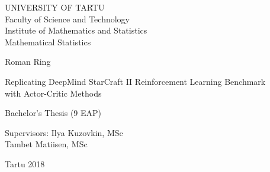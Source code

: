 \thispagestyle{empty}

\begin{center}

\large
UNIVERSITY OF TARTU\\
Faculty of Science and Technology\\
Institute of Mathematics and Statistics\\
Mathematical Statistics\\

\vspace{25mm}

\Large Roman Ring

\vspace{4mm}

\huge Replicating DeepMind StarCraft II 
Reinforcement Learning Benchmark \\
with Actor-Critic Methods

\vspace{4mm}

\Large Bachelor's Thesis (9 EAP)

\end{center}

\vspace{25mm}

\begin{flushright}
\Large Supervisors: Ilya Kuzovkin, MSc \\ 
              Tambet Matiisen, MSc
\end{flushright}

\vfill
\centerline{Tartu 2018}